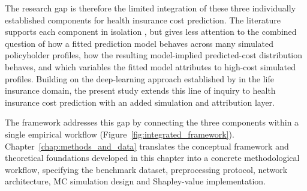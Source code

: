 \noindent
The research gap is therefore the limited integration of these three
individually established components for health insurance cost prediction.
The literature supports each component in isolation
\citep{wuthrich2023statistical, blierwong2021machine, kroese2011handbook,
covert2021explaining}, but gives less attention to the combined question of
how a fitted prediction model behaves across many simulated policyholder
profiles, how the resulting model-implied predicted-cost distribution behaves,
and which variables the fitted model attributes to high-cost simulated
profiles.  Building on the deep-learning approach established by
\citet{blomerus2025longterm} in the life insurance domain, the present
study extends this line of inquiry to health insurance cost prediction with
an added simulation and attribution layer.

\noindent
The framework addresses this gap by connecting the three components
within a single empirical workflow (Figure~\ref{fig:integrated_framework}).
Chapter~\ref{chap:methods_and_data} translates the conceptual framework and
theoretical foundations developed in this chapter into a concrete
methodological workflow, specifying the benchmark dataset, preprocessing
protocol, network architecture, MC simulation design and
Shapley-value implementation.
